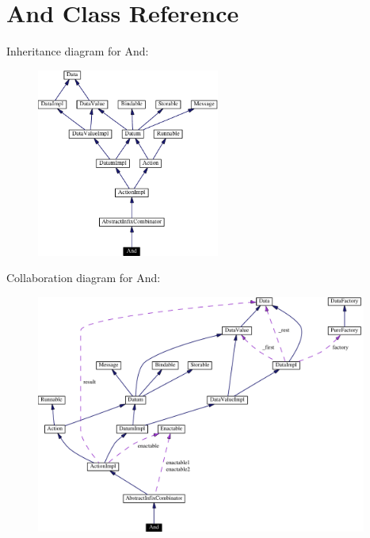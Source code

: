 \hypertarget{classAnd}{
\section{And  Class Reference}
\label{classAnd}
}
Inheritance diagram for And:\begin{figure}[H]
\begin{center}
\leavevmode
\includegraphics[width=170pt]{classAnd__inherit__graph}
\end{center}
\end{figure}
Collaboration diagram for And:\begin{figure}[H]
\begin{center}
\leavevmode
\includegraphics[width=308pt]{classAnd__coll__graph}
\end{center}
\end{figure}

